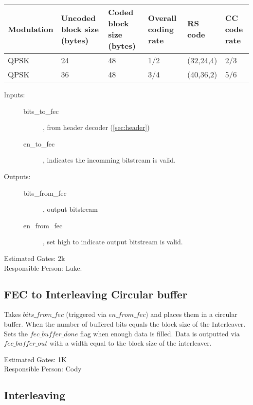 \documentclass[10pt]{article}
\begin{document}
		

			\begin{tabular}{p{2cm}|p{2cm}|p{2cm}|p{2cm}|p{2cm}|p{2cm}}
			\label{tbl:fec}
				Modulation & Uncoded block size (bytes) &
				Coded block size (bytes) & Overall coding
				rate & RS code & CC code rate \\ \hline
				QPSK & 24 & 48 & 1/2 & (32,24,4) & 2/3 \\
				QPSK & 36 & 48 & 3/4 & (40,36,2) & 5/6
			\end{tabular}


		\begin{description}
			\item[Inputs:] \begin{description}
				\item[bits\_to\_fec], from header decoder
					(\autoref{sec:header})
				\item[en\_to\_fec], indicates the incomming
					bitstream is valid.
			\end{description}
			\item[Outputs:] \begin{description}
				\item[bits\_from\_fec], output bitstream
				\item[en\_from\_fec], set high to indicate
					output bitstream is valid.
			\end{description}
		\end{description}

		Estimated Gates: 2k \\
		Responsible Person: Luke.

	\subsection{FEC to Interleaving Circular buffer}
		\label{sec:fec_buffer}

		Takes $bits\_from\_fec$ (triggered via $en\_from\_fec$) and
		places them in a circular buffer. When the number of
		buffered bits equals the block size of the Interleaver.
		Sets the $fec\_buffer\_done$ flag when enough data is
		filled. Data is outputted via $fec\_buffer\_out$ with a
		width equal to the block size of the interleaver.

		Estimated Gates: 1K \\
		Responsible Person: Cody

	\subsection{Interleaving}
		\label{sec:interleaving}
\end{document}
